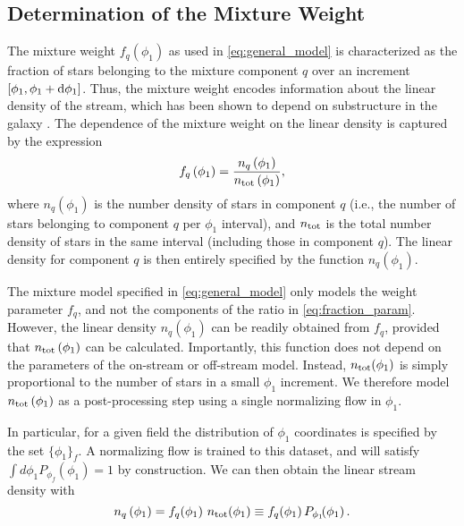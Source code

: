 \documentclass[twocolumn]{aastex631}
\begin{document}
    \subsection{Determination of the Mixture Weight} \label{sub:method:mixture_weight}

        The mixture weight $f_q(\phi_1)$ as used in \autoref{eq:general_model}
        is characterized as the fraction of stars belonging to the mixture
        component $q$ over an increment $[\phi_1, \phi_1 + \dif{\phi_1}]$. Thus,
        the mixture weight encodes information about the linear density of the
        stream, which has been shown to depend on substructure in the galaxy
        \citep{Siegal-GaskinsValluri2009, Yoon+2011}. The dependence of the
        mixture weight on the linear density is captured by the expression
        \begin{equation}\label{eq:fraction_param}
            f_q\left(\phi_1\right) = \frac{n_q\left(\phi_1\right)}{n_{\rm tot}\left(\phi_1\right)},
        \end{equation}
        where $n_q\left(\phi_1\right)$ is the number density of stars in
        component $q$ (i.e., the number of stars belonging to component $q$ per
        $\phi_1$ interval), and $n_{\rm tot}$ is the total number density of
        stars in the same interval (including those in component $q$). The
        linear  density for component $q$ is then entirely specified by the
        function $n_q(\phi_1)$.

        The mixture model specified in \autoref{eq:general_model} only models
        the weight parameter $f_q$, and not the components of the ratio in
        \autoref{eq:fraction_param}. However, the linear density $n_q(\phi_1)$
        can be readily obtained from $f_q$, provided that $n_{\rm
        tot}\left(\phi_1\right)$ can be calculated. Importantly, this function
        does not depend on the parameters of the on-stream or off-stream model.
        Instead, $n_{\rm tot}(\phi_1)$ is simply proportional to the number of
        stars in a small $\phi_1$ increment. We therefore model $n_{\rm
        tot}\left(\phi_1\right)$ as a post-processing step using a single
        normalizing flow in $\phi_1$. 

        In particular, for a given field the distribution of $\phi_1$
        coordinates is specified by the set $\{\phi_1\}_f$. A normalizing flow
        is trained to this dataset, and will satisfy $\int d\phi_1
        P_{\phi_f}(\phi_1) = 1$ by construction.  We can then obtain the linear
        stream density with
        \begin{equation}
            n_q\left(\phi_1\right) = f_q\!\left(\phi_1\right) \, n_{\rm tot}\!\left(\phi_1\right)  \equiv f_q\!\left(\phi_1\right) P_{\phi_1}\!\!\left(\phi_1\right) .
        \end{equation}
\end{document}
